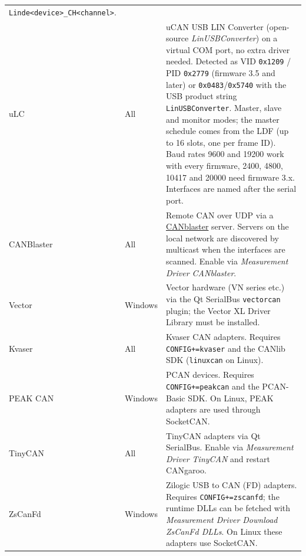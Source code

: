 \documentclass[a4paper,11pt]{article}
\newcommand{\menu}[1]{\textit{#1}}
\begin{document}
\begin{longtable}{p{3.2cm} p{2.2cm} p{7.8cm}}
                               \texttt{Linde<device>\_CH<channel>}. \\[0.4em]
  uLC             & All      & uCAN USB LIN Converter (open-source
                               \textit{LinUSBConverter}) on a virtual COM port, no extra
                               driver needed. Detected as VID \texttt{0x1209} /
                               PID \texttt{0x2779} (firmware 3.5 and later) or
                               \texttt{0x0483}/\texttt{0x5740} with the USB product string
                               \texttt{LinUSBConverter}. Master, slave and monitor modes;
                               the master schedule comes from the LDF (up to 16 slots,
                               one per frame ID). Baud rates 9600 and 19200 work with every
                               firmware, 2400, 4800, 10417 and 20000 need firmware 3.x.
                               Interfaces are named after the serial port. \\[0.4em]
  CANBlaster      & All      & Remote CAN over UDP via a
                               \href{https://github.com/OpenAutoDiagLabs/CANblaster}{CANblaster}
                               server. Servers on the local network are discovered
                               by multicast when the interfaces are scanned. Enable via
                               \menu{Measurement \textrightarrow{} Driver \textrightarrow{} CANblaster}. \\[0.4em]
  Vector          & Windows  & Vector hardware (VN series etc.) via the Qt SerialBus
                               \texttt{vectorcan} plugin; the Vector XL Driver Library
                               must be installed. \\[0.4em]
  Kvaser          & All      & Kvaser CAN adapters. Requires \texttt{CONFIG+=kvaser}
                               and the CANlib SDK (\texttt{linuxcan} on Linux). \\[0.4em]
  PEAK CAN        & Windows  & PCAN devices. Requires \texttt{CONFIG+=peakcan}
                               and the PCAN-Basic SDK. On Linux, PEAK adapters are
                               used through SocketCAN. \\[0.4em]
  TinyCAN         & All      & TinyCAN adapters via Qt SerialBus. Enable via
                               \menu{Measurement \textrightarrow{} Driver \textrightarrow{} TinyCAN}
                               and restart CANgaroo. \\[0.4em]
  ZsCanFd         & Windows  & Zilogic USB to CAN (FD) adapters. Requires
                               \texttt{CONFIG+=zscanfd}; the runtime DLLs can be fetched with
                               \menu{Measurement \textrightarrow{} Driver \textrightarrow{} Download ZsCanFd DLLs}.
                               On Linux these adapters use SocketCAN. \\
  \bottomrule
\end{longtable}
\end{document}
